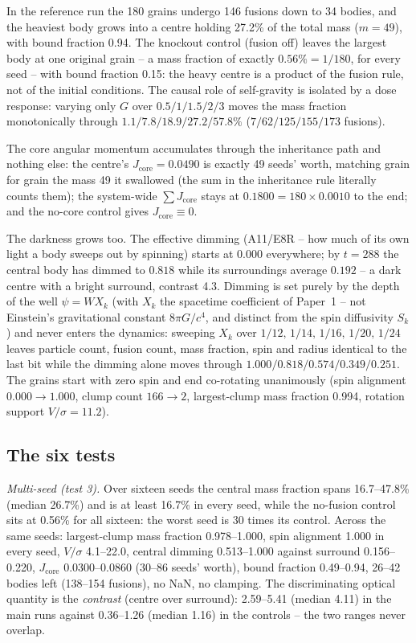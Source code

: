 \documentclass[aps,reprint,amsmath,amssymb,nofootinbib,superscriptaddress,floatfix]{revtex4-2}
\begin{document}
In the reference run the 180 grains undergo 146 fusions down to 34
bodies, and the heaviest body grows into a centre holding 27.2\% of the
total mass ($m=49$), with bound fraction 0.94. The knockout control
(fusion off) leaves the largest body at one original grain -- a mass
fraction of exactly $0.56\% = 1/180$, for every seed -- with bound
fraction 0.15: the heavy centre is a product of the fusion rule, not of
the initial conditions. The causal role of self-gravity is isolated by
a dose response: varying only $G$ over $0.5/1/1.5/2/3$ moves the mass
fraction monotonically through $1.1/7.8/18.9/27.2/57.8\%$
($7/62/125/155/173$ fusions).

The core angular momentum accumulates through the inheritance path and
nothing else: the centre's $J_{\mathrm{core}}=0.0490$ is exactly 49
seeds' worth, matching grain for grain the mass 49 it swallowed (the
sum in the inheritance rule literally counts them); the system-wide
$\sum J_{\mathrm{core}}$ stays at $0.1800 = 180\times0.0010$ to the
end; and the no-core control gives $J_{\mathrm{core}}\equiv 0$.

The darkness grows too. The effective dimming (A11/E8R -- how much of
its own light a body sweeps out by spinning) starts at $0.000$
everywhere; by $t=288$ the central body has dimmed to $0.818$ while its
surroundings average $0.192$ -- a dark centre with a bright surround,
contrast 4.3. Dimming is set purely by the depth of the well
$\psi=W X_k$ (with $X_k$ the spacetime coefficient of Paper~1 --
not Einstein's gravitational constant $8\pi G/c^4$, and distinct from
the spin diffusivity $S_k$) and never enters the dynamics:
sweeping $X_k$ over
$1/12,\,1/14,\,1/16,\,1/20,\,1/24$ leaves particle count, fusion count, mass fraction,
spin and radius identical to the last bit while the dimming alone moves
through $1.000/0.818/0.574/0.349/0.251$. The grains start with zero
spin and end co-rotating unanimously (spin alignment
$0.000\rightarrow1.000$, clump count $166\rightarrow2$, largest-clump
mass fraction 0.994, rotation support $V/\sigma=11.2$).

\subsection{The six tests}

\emph{Multi-seed (test 3).} Over sixteen seeds the central mass
fraction spans 16.7--47.8\% (median 26.7\%) and is at least 16.7\% in
every seed, while the no-fusion control sits at 0.56\% for all sixteen:
the worst seed is 30 times its control. Across the same seeds:
largest-clump mass fraction 0.978--1.000, spin alignment 1.000 in every
seed, $V/\sigma$ 4.1--22.0, central dimming 0.513--1.000 against
surround 0.156--0.220, $J_{\mathrm{core}}$ 0.0300--0.0860 (30--86
seeds' worth), bound fraction 0.49--0.94, 26--42 bodies left
(138--154 fusions), no NaN, no clamping. The discriminating optical
quantity is the \emph{contrast} (centre over surround): 2.59--5.41
(median 4.11) in the main runs against 0.36--1.26 (median 1.16) in the
controls -- the two ranges never overlap.
\end{document}
